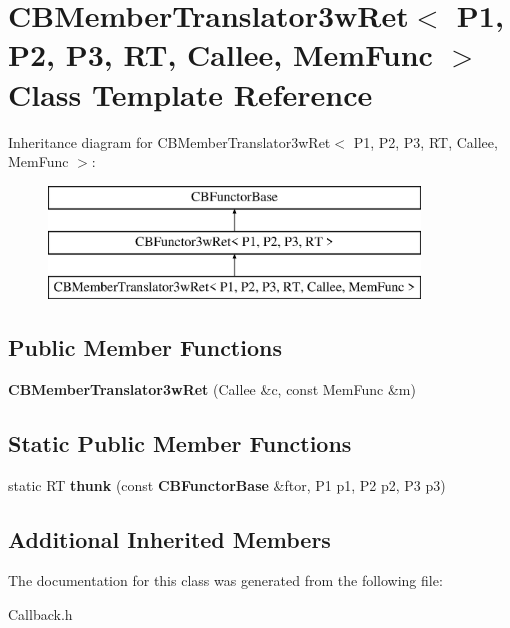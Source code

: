 \section{C\+B\+Member\+Translator3w\+Ret$<$ P1, P2, P3, RT, Callee, Mem\+Func $>$ Class Template Reference}
\label{classCBMemberTranslator3wRet}
Inheritance diagram for C\+B\+Member\+Translator3w\+Ret$<$ P1, P2, P3, RT, Callee, Mem\+Func $>$\+:\begin{figure}[H]
\begin{center}
\leavevmode
\includegraphics[height=3.000000cm]{classCBMemberTranslator3wRet}
\end{center}
\end{figure}
\subsection*{Public Member Functions}
\begin{DoxyCompactItemize}
\item 
{\bfseries C\+B\+Member\+Translator3w\+Ret} (Callee \&c, const Mem\+Func \&m)\label{classCBMemberTranslator3wRet_a71e2bbd6db9020a6b541a650ff7d81d5}

\end{DoxyCompactItemize}
\subsection*{Static Public Member Functions}
\begin{DoxyCompactItemize}
\item 
static RT {\bfseries thunk} (const {\bf C\+B\+Functor\+Base} \&ftor, P1 p1, P2 p2, P3 p3)\label{classCBMemberTranslator3wRet_a87eed002836701d52bf8f243c6fcc338}

\end{DoxyCompactItemize}
\subsection*{Additional Inherited Members}


The documentation for this class was generated from the following file\+:\begin{DoxyCompactItemize}
\item 
Callback.\+h\end{DoxyCompactItemize}
